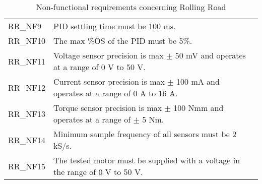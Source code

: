 \begin{table}[h!]
\begin{tabular}{|p{2 cm}|p{10 cm}|p{2 cm}|}
		& \\ \hline
		RR\_NF9
		& PID settling time must be 100 ms. 
		&  \\ \hline
		RR\_NF10
		& The max \%OS of the PID must be 5\%. 
		&  \\ \hline
		RR\_NF11
		& Voltage sensor precision is max $\pm$ 50 mV and operates at a range of 0 V to 50 V. 
		&  \\ \hline
		RR\_NF12
		& Current sensor precision is max $\pm$ 100 mA and operates at a range of 0 A to 16 A. 
		&  \\ \hline
		RR\_NF13
		& Torque sensor precision is max $\pm$ 100 Nmm and operates at a range of $\pm$ 5 Nm. 
		&  \\ \hline
		RR\_NF14
		& Minimum sample frequency of all sensors must be 2 kS/s.  
		&  \\ \hline
		RR\_NF15
		& The tested motor must be supplied with a voltage in the range of 0 V to 50 V. 
		&  \\ \hline
	\end{tabular}
	\caption{Non-functional requirements concerning Rolling Road}
\end{table}

